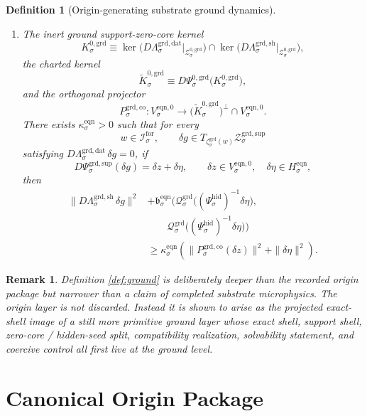 \documentclass[11pt]{article}
\newcommand{\ForSpace}[1]{\mathcal I_{#1}^{\mathrm{for}}}
\newcommand{\HiddenChart}[1]{\Psi_{#1}^{\mathrm{hid}}}
\newcommand{\GroundData}[1]{\Lambda_{#1}^{\mathrm{grd,dat}}}
\newcommand{\GroundShellMap}[1]{\Lambda_{#1}^{\mathrm{grd,sh}}}
\newcommand{\GroundSupportShell}[1]{\mathcal Z_{#1}^{\mathrm{grd,sup}}}
\newcommand{\GroundZeroCore}[1]{\mathcal Z_{#1}^{0,\mathrm{grd}}}
\newcommand{\GroundEqChart}[1]{\Psi_{#1}^{\mathrm{grd,sup}}}
\newcommand{\GroundZeroChart}[1]{\Psi_{#1}^{0,\mathrm{grd}}}
\newcommand{\GroundCharge}[1]{\mathcal Q_{#1}^{\mathrm{grd}}}
\newcommand{\GroundEmbed}[1]{\zeta_{#1}^{\mathrm{grd}}}
\newcommand{\GroundKernel}[1]{K_{#1}^{0,\mathrm{grd}}}
\newcommand{\GroundKernelCh}[1]{\widetilde K_{#1}^{0,\mathrm{grd}}}
\newcommand{\GroundStateComp}[1]{P_{#1}^{\mathrm{grd,co}}}
\newcommand{\EqnPair}[1]{\mathfrak b_{#1}^{\mathrm{eqn}}}
\newcommand{\EqnHidden}[1]{H_{#1}^{\mathrm{eqn}}}
\newcommand{\EqnZero}[1]{V_{#1}^{\mathrm{eqn},0}}
\newtheorem{definition}{Definition}
\newtheorem{remark}{Remark}
\begin{document}
\begin{definition}[Origin-generating substrate ground dynamics]
\begin{enumerate}
    \item The inert ground support-zero-core kernel
    \[
    \GroundKernel{\sigma}
    \equiv
    \ker\bigl(D\GroundData{\sigma}\big|_{\GroundZeroCore{\sigma}}\bigr)
    \cap
    \ker\bigl(D\GroundShellMap{\sigma}\big|_{\GroundZeroCore{\sigma}}\bigr),
    \]
    the charted kernel
    \[
    \GroundKernelCh{\sigma}
    \equiv
    D\GroundZeroChart{\sigma}\bigl(\GroundKernel{\sigma}\bigr),
    \]
    and the orthogonal projector
    \[
    \GroundStateComp{\sigma}:
    \EqnZero{\sigma}\to
    \bigl(\GroundKernelCh{\sigma}\bigr)^{\perp}\cap\EqnZero{\sigma}.
    \]
    There exists \(\kappa_{\sigma}^{\mathrm{eqn}}>0\) such that for every
    \[
    w\in\ForSpace{\sigma},
    \qquad
    \delta g\in T_{\GroundEmbed{\sigma}(w)}\GroundSupportShell{\sigma}
    \]
    satisfying \(D\GroundData{\sigma}\,\delta g=0\), if
    \[
    D\GroundEqChart{\sigma}(\delta g)=\delta z+\delta\eta,
    \qquad
    \delta z\in\EqnZero{\sigma},
    \quad
    \delta\eta\in\EqnHidden{\sigma},
    \]
    then
    \begin{equation}
    \begin{aligned}
    \|D\GroundShellMap{\sigma}\,\delta g\|^{2}
    &+
    \EqnPair{\sigma}\bigl(
    \GroundCharge{\sigma}\bigl((\HiddenChart{\sigma})^{-1}\delta\eta\bigr),\\
    &\qquad
    \GroundCharge{\sigma}\bigl((\HiddenChart{\sigma})^{-1}\delta\eta\bigr)
    \bigr)
    \\
    &\ge
    \kappa_{\sigma}^{\mathrm{eqn}}
    \left(
    \|\GroundStateComp{\sigma}(\delta z)\|^{2}
    +
    \|\delta\eta\|^{2}
    \right).
    \end{aligned}
    \label{eq:groundcoercive}
    \end{equation}
\end{enumerate}
\end{definition}

\begin{remark}
Definition \ref{def:ground} is deliberately deeper than the recorded origin package but narrower than a claim of completed substrate microphysics. The origin layer is not discarded. Instead it is shown to arise as the projected exact-shell image of a still more primitive ground layer whose exact shell, support shell, zero-core / hidden-seed split, compatibility realization, solvability statement, and coercive control all first live at the ground level.
\end{remark}

\section{Canonical Origin Package}
\end{document}
